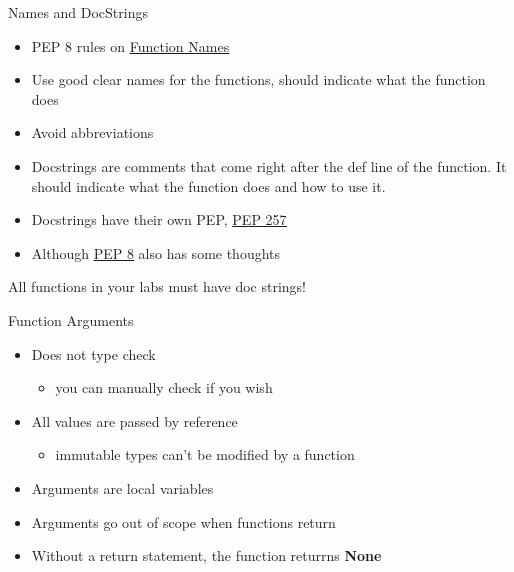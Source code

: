 % 
% 
% 
\begin{Slide}{Names and DocStrings}

  \begin{itemize}
  \item PEP 8 rules on \underline{\href{https://www.python.org/dev/peps/pep-0008/\#function-names}{Function Names}}
  \item Use good clear names for the functions, should indicate what the function does
  \item Avoid abbreviations
  \item Docstrings are comments that come right after the def line of the function.  It should indicate what the function does and how to use it.  
\item Docstrings have their own PEP, \underline{\href{https://www.python.org/dev/peps/pep-0257/}{PEP 257}}
\item Although \underline{\href{https://www.python.org/dev/peps/pep-0008/\#documentation-strings}{PEP 8}} also has some thoughts
  \end{itemize}
\pause
\begin{alertblock}
{All functions in your labs must have doc strings!}
\end{alertblock}


\end{Slide}

% 
% 
% 
\begin{Slide}{Function Arguments}
  \begin{itemize}
  \item Does not type check
  \begin{itemize}
  \item you can manually check if you wish
  \end{itemize}
\item All values are passed by reference
 \begin{itemize}
  \item immutable types can't be modified by a function
  \end{itemize}
\item Arguments are local variables 
\item Arguments go out of scope when functions return
\item Without a return statement, the function returrns \textbf{None}
  \end{itemize}
\end{Slide}

